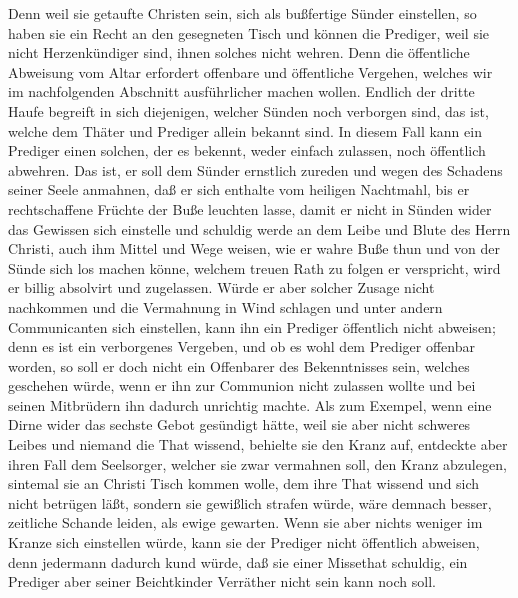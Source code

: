 Denn weil sie getaufte Christen sein, sich als bußfertige Sünder einstellen, so haben sie ein Recht an den gesegneten Tisch und können die Prediger, weil sie nicht Herzenkündiger sind, ihnen solches nicht wehren. Denn die öffentliche Abweisung vom Altar erfordert offenbare und öffentliche Vergehen, welches wir im nachfolgenden Abschnitt ausführlicher machen wollen.
Endlich der dritte Haufe begreift in sich diejenigen, welcher Sünden noch verborgen sind, das ist, welche dem Thäter und Prediger allein bekannt sind. In diesem Fall kann ein Prediger einen solchen, der es bekennt, weder einfach zulassen, noch öffentlich abwehren. Das ist, er soll dem Sünder ernstlich zureden und wegen des Schadens seiner Seele anmahnen, daß er sich enthalte vom heiligen Nachtmahl, bis er rechtschaffene Früchte der Buße leuchten lasse, damit er nicht in Sünden wider das Gewissen sich einstelle und schuldig werde an dem Leibe und Blute des Herrn Christi, auch ihm Mittel und Wege weisen, wie er wahre Buße thun und von der Sünde sich los machen könne, welchem treuen Rath zu folgen er verspricht, wird er billig absolvirt und zugelassen. Würde er aber solcher Zusage nicht nachkommen und die Vermahnung in Wind schlagen und unter andern Communicanten sich einstellen, kann ihn ein Prediger öffentlich nicht abweisen; denn es ist ein verborgenes Vergeben, und ob es wohl dem Prediger offenbar worden, so soll er doch nicht ein Offenbarer des Bekenntnisses sein, welches geschehen würde, wenn er ihn zur Communion nicht zulassen wollte und bei seinen Mitbrüdern ihn dadurch unrichtig machte. Als zum Exempel, wenn eine Dirne wider das sechste Gebot gesündigt hätte, weil sie aber nicht schweres Leibes und niemand die That wissend, behielte sie den Kranz auf, entdeckte aber ihren Fall dem Seelsorger, welcher sie zwar vermahnen soll, den Kranz abzulegen, sintemal sie an Christi Tisch kommen wolle, dem ihre That wissend und sich nicht betrügen läßt, sondern sie gewißlich strafen würde, wäre demnach besser, zeitliche Schande leiden, als ewige gewarten. Wenn sie aber nichts weniger im Kranze sich einstellen würde, kann sie der Prediger nicht öffentlich abweisen, denn jedermann dadurch kund würde, daß sie einer Missethat schuldig, ein Prediger aber seiner Beichtkinder Verräther nicht sein kann noch soll.

